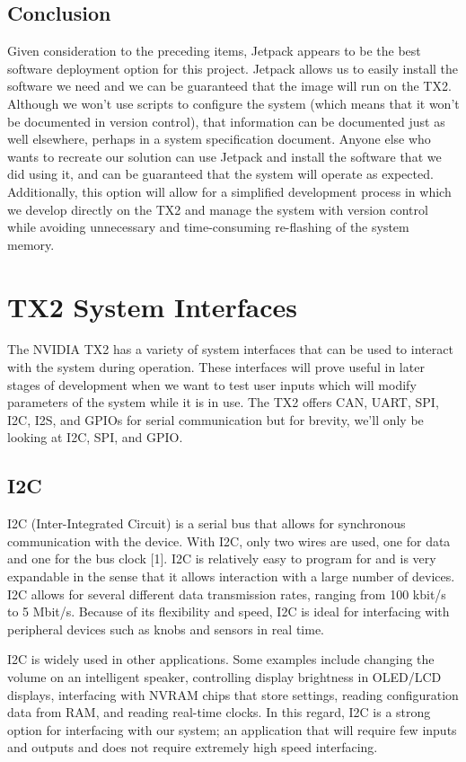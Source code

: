 \documentclass[letterpaper,10pt,serif,draftclsnofoot,onecolumn,compsoc,titlepage]{IEEEtran}
\begin{document}
\subsection{Conclusion}
Given consideration to the preceding items, Jetpack appears to be the best software deployment option for this project. Jetpack allows us to easily install the software we need and we can be guaranteed that the image will run on the TX2. Although we won’t use scripts to configure the system (which means that it won’t be documented in version control), that information can be documented just as well elsewhere, perhaps in a system specification document. Anyone else who wants to recreate our solution can use Jetpack and install the software that we did using it, and can be guaranteed that the system will operate as expected. Additionally, this option will allow for a simplified development process in which we develop directly on the TX2 and manage the system with version control while avoiding unnecessary and time-consuming re-flashing of the system memory.

\newpage
\section{TX2 System Interfaces}
The NVIDIA TX2 has a variety of system interfaces that can be used to interact with the system during operation. These interfaces will prove useful in later stages of development when we want to test user inputs which will modify parameters of the system while it is in use. The TX2 offers CAN, UART, SPI, I2C, I2S, and GPIOs for serial communication but for brevity, we’ll only be looking at I2C, SPI, and GPIO.

\subsection{I2C}
I2C (Inter-Integrated Circuit) is a serial bus that allows for synchronous communication with the device. With I2C, only two wires are used, one for data and one for the bus clock [1]. I2C is relatively easy to program for and is very expandable in the sense that it allows interaction with a large number of devices. I2C allows for several different data transmission rates, ranging from 100 kbit/s to 5 Mbit/s. Because of its flexibility and speed, I2C is ideal for interfacing with peripheral devices such as knobs and sensors in real time. 

I2C is widely used in other applications. Some examples include changing the volume on an intelligent speaker, controlling display brightness in OLED/LCD displays, interfacing with NVRAM chips that store settings, reading configuration data from RAM, and reading real-time clocks. In this regard, I2C is a strong option for interfacing with our system; an application that will require few inputs and outputs and does not require extremely high speed interfacing.
\end{document}

